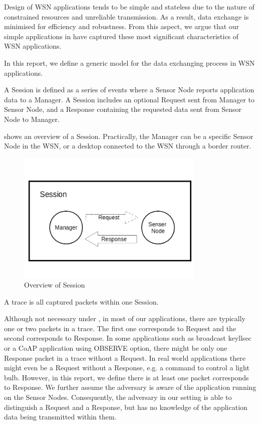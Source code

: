 Design of WSN applications tends to be simple and stateless due to the nature of constrained resources and unreliable transmission. As a result, data exchange is minimised for efficiency and robustness. From this aspect, we argue that our simple applications in  have captured these most significant characteristics of WSN applications.

In this report, we define a generic model for the data exchanging process in WSN applications.

\begin{definition} \label{Def: Session}
A Session is defined as a series of events where a Sensor Node reports application data to a Manager. A Session includes an optional Request sent from Manager to Sensor Node, and a Response containing the requested data sent from Sensor Node to Manager.
\end{definition}

 shows an overview of a Session. Practically, the Manager can be a specific Sensor Node in the WSN, or a desktop connected to the WSN through a border router.

\begin{figure}[h!]
	\center
	\includegraphics[width=0.8\textwidth]{fig/Session.png}
	\caption{Overview of Session}
	\label{Fig: Overview Session}
\end{figure}

\begin{definition} \label{Def: Trace}
A trace is all captured packets within one Session.
\end{definition}

Although not necessary under , in most of our applications, there are typically one or two packets in a trace. The first one corresponds to Request and the second corresponds to Response. In some applications such as broadcast keyllsec or a CoAP application using OBSERVE option, there might be only one Response packet in a trace without a Request. In real world applications there might even be a Request without a Response, e.g. a command to control a light bulb. However, in this report, we define there is at least one packet corresponds to Response. We further assume the adversary is aware of the application running on the Sensor Nodes. Consequently, the adversary in our setting is able to distinguish a Request and a Response, but has no knowledge of the application data being transmitted within them.

